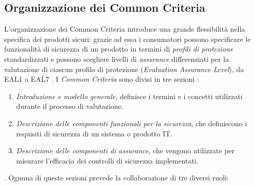 \documentclass[../main.tex]{subfiles}
\begin{document}
\subsection{Organizzazione dei Common Criteria}
L'organizzazione dei Common Criteria introduce una grande flessibilità nella specifica dei prodotti sicuri: grazie ad essa i consumatori possono specificare le funzionalità di sicurezza di un prodotto in termini di \textit{profili di protezione} standardizzati e possono scegliere livelli di \textit{assurance} differenziati per la valutazione di ciascun profilo di protezione (\textit{Evaluation Assurance Level}), da EAL1 a EAL7 \cite{SyntegraCC}.
I \textit{Common Criteria} sono divisi in tre sezioni \cite{CommonCriteriaSans}:
\begin{enumerate}
\item \textit{Introduzione e modello generale}, definisce i termini e i concetti utilizzati durante il processo di valutazione.
\item \textit{Descrizione delle componenti funzionali per la sicurezza}, che definiscono i requisiti di sicurezza di un sistema o prodotto IT.
\item \textit{Descrizione delle componenti di \textit{assurance}}, che vengono utilizzate per misurare l'efficacia dei controlli di sicurezza implementati.
\end{enumerate}.
Ognuna di queste sezioni prevede la collaborazione di tre diversi ruoli:
\end{document}
